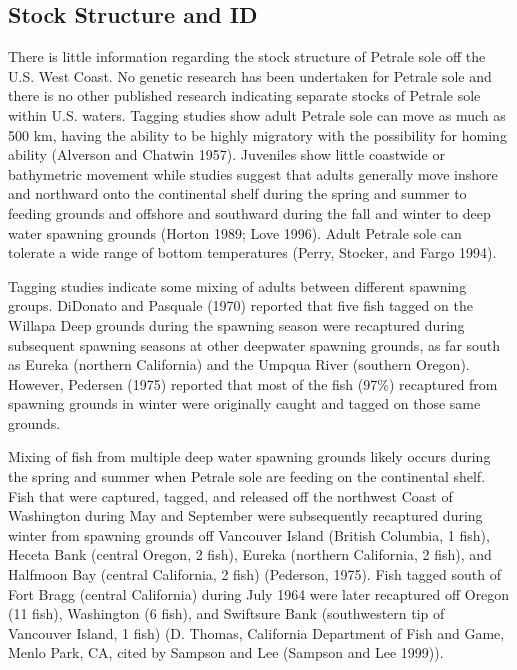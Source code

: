 \documentclass[
]{scrartcl}
\begin{document}
\subsection{Stock Structure and ID}\label{stock-structure-and-id}

There is little information regarding the stock structure of Petrale
sole off the U.S. West Coast. No genetic research has been undertaken
for Petrale sole and there is no other published research indicating
separate stocks of Petrale sole within U.S. waters. Tagging studies show
adult Petrale sole can move as much as 500 km, having the ability to be
highly migratory with the possibility for homing ability (Alverson and
Chatwin 1957). Juveniles show little coastwide or bathymetric movement
while studies suggest that adults generally move inshore and northward
onto the continental shelf during the spring and summer to feeding
grounds and offshore and southward during the fall and winter to deep
water spawning grounds (Horton 1989; Love 1996). Adult Petrale sole can
tolerate a wide range of bottom temperatures (Perry, Stocker, and Fargo
1994).

Tagging studies indicate some mixing of adults between different
spawning groups. DiDonato and Pasquale (1970) reported that five fish
tagged on the Willapa Deep grounds during the spawning season were
recaptured during subsequent spawning seasons at other deepwater
spawning grounds, as far south as Eureka (northern California) and the
Umpqua River (southern Oregon). However, Pedersen (1975) reported that
most of the fish (97\%) recaptured from spawning grounds in winter were
originally caught and tagged on those same grounds.

Mixing of fish from multiple deep water spawning grounds likely occurs
during the spring and summer when Petrale sole are feeding on the
continental shelf. Fish that were captured, tagged, and released off the
northwest Coast of Washington during May and September were subsequently
recaptured during winter from spawning grounds off Vancouver Island
(British Columbia, 1 fish), Heceta Bank (central Oregon, 2 fish), Eureka
(northern California, 2 fish), and Halfmoon Bay (central California, 2
fish) (Pederson, 1975). Fish tagged south of Fort Bragg (central
California) during July 1964 were later recaptured off Oregon (11 fish),
Washington (6 fish), and Swiftsure Bank (southwestern tip of Vancouver
Island, 1 fish) (D. Thomas, California Department of Fish and Game,
Menlo Park, CA, cited by Sampson and Lee (Sampson and Lee 1999)).
\end{document}
